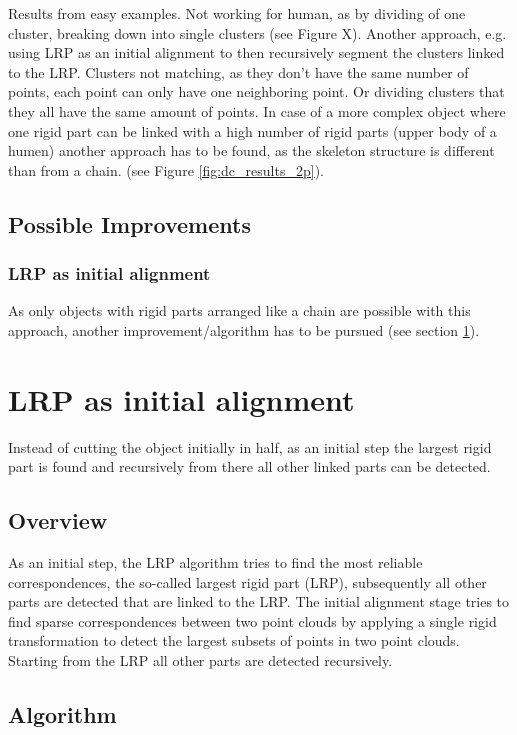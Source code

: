 \documentclass[a4paper,english,11pt]{report}
\begin{document}
Results from easy examples. Not working for human, as by dividing of one cluster, breaking down into single clusters (see Figure X). Another approach, e.g. using LRP as an initial alignment to then recursively segment the clusters linked to the LRP. Clusters not matching, as they don't have the same number of points, each point can only have one neighboring point. Or dividing clusters that they all have the same amount of points. In case of a more complex object where one rigid part can be linked with a high number of rigid parts (upper body of a humen) another approach has to be found, as the skeleton structure is different than from a chain. (see Figure \ref{fig:dc_results_2p}).

\subsection{Possible Improvements}


\subsubsection{LRP as initial alignment}

As only objects with rigid parts arranged like a chain are possible with this approach, another improvement/algorithm has to be pursued (see section \ref{sec:LRP}).

\section{LRP as initial alignment}
\label{sec:LRP}

Instead of cutting the object initially in half, as an initial step the largest rigid part is found and recursively from there all other linked parts can be detected.

\subsection{Overview}
As an initial step, the LRP algorithm tries to find the most reliable correspondences, the so-called largest rigid part (LRP), subsequently all other parts are detected that are linked to the LRP. The initial alignment stage tries to find sparse correspondences between two point clouds by applying a single rigid transformation to detect the largest subsets of points in two point clouds. Starting from the LRP all other parts are detected recursively.

\subsection{Algorithm} 
\end{document}
